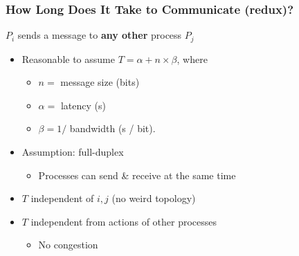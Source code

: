 \documentclass[xcolor={rgb,x11names,svgnames},rgb,x11names,svgnames]{beamer}
\begin{document}
\begin{frame}
  \frametitle{How Long Does It Take to Communicate (redux)?}
  
  
  \begin{block}{$P_i$ sends a message to \textbf{\alert{any other}} process $P_j$}
    \begin{itemize}
    \item Reasonable to assume \alert{$T = \alpha + n \times \beta$}, where
      \begin{itemize}
      \item $n =$ message size (bits)
      \item $\alpha =$ \alert{latency} (s)
      \item $\beta = 1 / $ \alert{bandwidth} (s / bit).
      \end{itemize}

      \medskip

    \item Assumption: \alert{full-duplex}
      \begin{itemize}
      \item Processes can send \& receive at the same time
      \end{itemize}

    \item $T$ \alert{independent} of $i, j$ (no weird topology)
    \item $T$ \alert{independent} from actions of other processes
      \begin{itemize}
      \item No congestion
      \end{itemize}
    \end{itemize}
  \end{block}
\end{frame}
\end{document}
